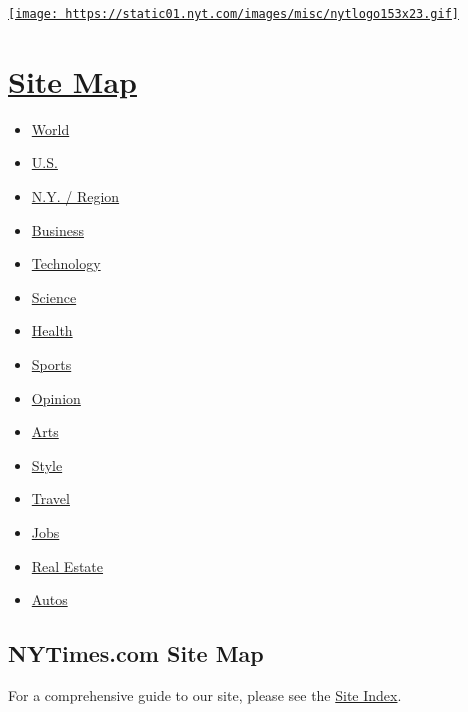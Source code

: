 \href{http://www.nytimes.com}{\texttt{[image: https://static01.nyt.com/images/misc/nytlogo153x23.gif]}}

\hypertarget{site-map}{%
\section{\texorpdfstring{\href{http://spiderbites.nytimes.com}{Site
Map}}{Site Map}}\label{site-map}}

\begin{itemize}
\tightlist
\item
  \href{http://www.nytimes.com/pages/world/index.html}{World}
\item
  \href{http://www.nytimes.com/pages/national/index.html}{U.S.}
\item
  \href{http://www.nytimes.com/pages/nyregion/index.html}{N.Y. / Region}
\item
  \href{http://www.nytimes.com/pages/business/index.html}{Business}
\item
  \href{http://www.nytimes.com/pages/technology/index.html}{Technology}
\item
  \href{http://www.nytimes.com/pages/science/index.html}{Science}
\item
  \href{http://www.nytimes.com/pages/health/index.html}{Health}
\item
  \href{http://www.nytimes.com/pages/sports/index.html}{Sports}
\item
  \href{http://www.nytimes.com/pages/opinion/index.html}{Opinion}
\item
  \href{http://www.nytimes.com/pages/arts/index.html}{Arts}
\item
  \href{http://www.nytimes.com/pages/style/index.html}{Style}
\item
  \href{http://travel.nytimes.com}{Travel}
\item
  \href{http://jobmarket.nytimes.com/pages/jobs/index.html}{Jobs}
\item
  \href{http://www.nytimes.com/pages/realestate/index.html}{Real Estate}
\item
  \href{http://www.nytimes.com/pages/automobiles/index.html}{Autos}
\end{itemize}

\hypertarget{nytimescom-site-map}{%
\subsection{NYTimes.com Site Map}\label{nytimescom-site-map}}

For a comprehensive guide to our site, please see the
\href{http://www.nytimes.com/ref/membercenter/help/siteindex.html}{Site
Index}.

